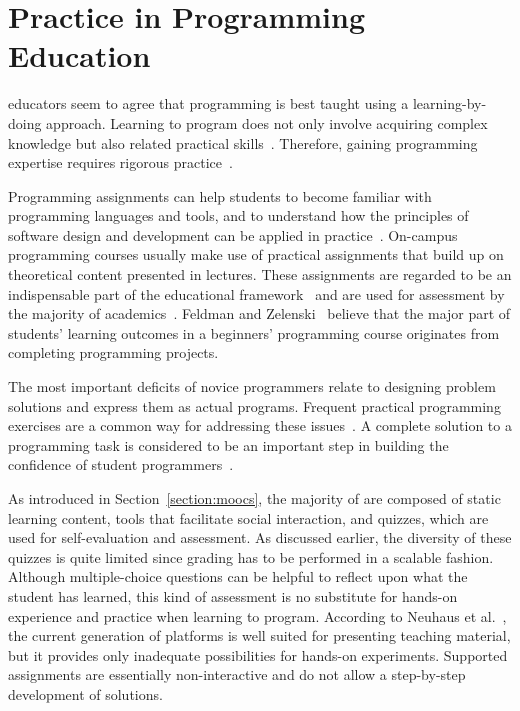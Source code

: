 \section{Practice in Programming Education}\label{section:practical-programming}

\cs educators seem to agree that programming is best taught using a learning-by-doing approach. Learning to program does not only involve acquiring complex knowledge but also related practical skills~\cite{robins2003learning}. Therefore, gaining programming expertise requires rigorous practice~\cite{vihavainen2012multi}.

Programming assignments can help students to become familiar with programming languages and tools, and to understand how the principles of software design and development can be applied in practice~\cite{douce2005automatic}. On-campus programming courses usually make use of practical assignments that build up on theoretical content presented in lectures. These assignments are regarded to be an indispensable part of the educational framework~\cite{neuhaus2014platform} and are used for assessment by the majority of \cs academics~\cite{staubitz2014lightweight}. Feldman and Zelenski~\cite{feldman1996quest} believe that the major part of students' learning outcomes in a beginners' programming course originates from completing programming projects.

The most important deficits of novice programmers relate to designing problem solutions and express them as actual programs. Frequent practical programming exercises are a common way for addressing these issues~\cite{robins2003learning}. A complete solution to a programming task is considered to be an important step in building the confidence of student programmers~\cite{douce2005automatic}.

As introduced in Section~\ref{section:moocs}, the majority of \moocs are composed of static learning content, tools that facilitate social interaction, and quizzes, which are used for self-evaluation and assessment. As discussed earlier, the diversity of these quizzes is quite limited since grading has to be performed in a scalable fashion. Although multiple-choice questions can be helpful to reflect upon what the student has learned, this kind of assessment is no substitute for hands-on experience and practice when learning to program. According to Neuhaus et al.~\cite{neuhaus2014platform}, the current generation of \mooc platforms is well suited for presenting teaching material, but it provides only inadequate possibilities for hands-on experiments. Supported assignments are essentially non-interactive and do not allow a step-by-step development of solutions.

